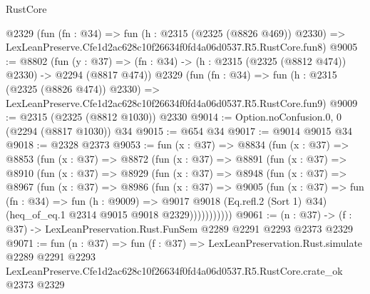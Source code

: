 \begin{lexlean}{RustCore}
\begin{coremodule}
    @2329
    (fun (fn : @34) =>
    fun (h : @2315 (@2325 (@8826 @469)) @2330) =>
    LexLeanPreserve.Cfe1d2ac628c10f26634f0fd4a06d0537.R5.RustCore.fun8)
@9005 := @8802
    (fun (y : @37) => (fn : @34) -> (h : @2315 (@2325 (@8812 @474)) @2330) -> @2294 (@8817 @474))
    @2329
    (fun (fn : @34) =>
    fun (h : @2315 (@2325 (@8826 @474)) @2330) =>
    LexLeanPreserve.Cfe1d2ac628c10f26634f0fd4a06d0537.R5.RustCore.fun9)
@9009 := @2315 (@2325 (@8812 @1030)) @2330
@9014 := Option.noConfusion.{0, 0} (@2294 (@8817 @1030)) @34
@9015 := @654 @34
@9017 := @9014 @9015 @34
@9018 := @2328 @2373
@9053 := fun (x : @37) =>
  @8834
    (fun (x : @37) =>
    @8853
      (fun (x : @37) =>
      @8872
        (fun (x : @37) =>
        @8891
          (fun (x : @37) =>
          @8910
            (fun (x : @37) =>
            @8929
              (fun (x : @37) =>
              @8948
                (fun (x : @37) =>
                @8967
                  (fun (x : @37) =>
                  @8986
                    (fun (x : @37) =>
                    @9005
                      (fun (x : @37) =>
                      fun (fn : @34) =>
                      fun (h : @9009) =>
                      @9017
                        @9018
                        (Eq.refl.{2} (Sort 1) @34)
                        (heq_of_eq.{1} @2314 @9015 @9018 @2329)))))))))))
@9061 := (n : @37) -> (f : @37) -> LexLeanPreservation.Rust.FunSem @2289 @2291 @2293 @2373 @2329
@9071 := fun (n : @37) =>
  fun (f : @37) =>
  LexLeanPreservation.Rust.simulate
    @2289
    @2291
    @2293
    LexLeanPreserve.Cfe1d2ac628c10f26634f0fd4a06d0537.R5.RustCore.crate_ok
    @2373
    @2329
\end{coremodule}
\end{lexlean}
